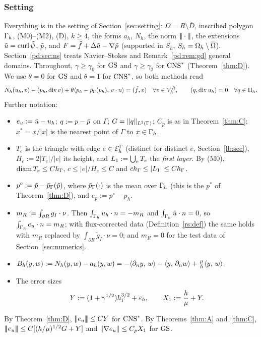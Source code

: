 \subsubsection{Setting}
Everything is in the setting of Section~\ref{sec:setting}: $\Omega=R\setminus\overline D$, inscribed polygon $\Gamma_h$, (M0)--(M2), (D), $k\ge4$, the forms $a_h$, $N_h$, the norm $|\!|\!|\cdot|\!|\!|$, the extensions $\tilde u=\operatorname{curl}\tilde\psi$, $\tilde p$, and $F=\tilde f+\Delta\tilde u-\nabla\tilde p$ (supported in $\overline{S_h}$, $S_h=\Omega_h\setminus\overline\Omega$). Section~\ref{pd:sec:ns} treats Navier--Stokes and Remark~\ref{pd:rem:gd} general domains. Throughout, $\gamma\ge\gamma_0$ for $\mathrm{GS}$ and $\gamma\ge\gamma_2$ for $\mathrm{CNS}^\ast$ (Theorem~\ref{thm:D}). We use $\theta=0$ for $\mathrm{GS}$ and $\theta=1$ for $\mathrm{CNS}^\ast$, so both methods read
\[
N_h(u_h,v)-(p_h,\operatorname{div} v)+\theta\langle p_h-\bar p_{\Gamma}(p_h),\, v\cdot n\rangle=(\tilde f,v)\quad\forall v\in V_h^R,\qquad (q,\operatorname{div} u_h)=0\quad\forall q\in\Pi_h .
\]
Further notation:
\begin{itemize}
\item $e_u:=\tilde u-u_h$; $q:=p-\bar p$ on $\Gamma$; $G=\lVert q\rVert_{L^2(\Gamma)}$; $C_p$ is as in Theorem~\ref{thm:C}; $x^\ast=x/|x|$ is the nearest point of $\Gamma$ to $x\in\Gamma_h$.
\item $T_e$ is the triangle with edge $e\in\mathcal E_h^\Gamma$ (distinct for distinct $e$, Section~\ref{lb:sec}), $H_e:=2|T_e|/|e|$ its height, and $L_1:=\bigcup_eT_e$ the \emph{first layer}. By (M0), $\operatorname{diam} T_e\le Ch_\Gamma$, $c\le |e|/H_e\le C$ and $ch_\Gamma\le|L_1|\le Ch_\Gamma$.
\item $p^\circ:=\tilde p-\bar p_{\Gamma}(\tilde p)$, where $\bar p_{\Gamma}(\cdot)$ is the mean over $\Gamma_h$ (this is the $p^\ast$ of Theorem~\ref{thm:D}), and $e_p:=p^\circ-p_h$.
\item $m_R:=\int_{\partial R}g_I\cdot\nu$. Then $\int_{\Gamma_h}u_h\cdot n=-m_R$ and $\int_{\Gamma_h}\tilde u\cdot n=0$, so $\int_{\Gamma_h}e_u\cdot n=m_R$; with flux-corrected data (Definition~\ref{rs:def}) the same holds with $m_R$ replaced by $\int_{\partial R}\tilde g_I\cdot\nu=0$; and $m_R=0$ for the test data of Section~\ref{sec:numerics}.
\item $B_h(y,w):=N_h(y,w)-a_h(y,w)=-\langle \partial_n y,\, w\rangle-\langle y,\, \partial_n w\rangle+\frac\mu h\langle y,\, w\rangle$.
\item The error sizes
\[
Y:=(1+\gamma^{1/2})h_\Gamma^{3/2}+\varepsilon_h,\qquad X_1:=\frac h\mu+Y .
\]
\end{itemize}
By Theorem~\ref{thm:D}, $|\!|\!|e_u|\!|\!|\le CY$ for $\mathrm{CNS}^\ast$. By Theorems~\ref{thm:A} and~\ref{thm:C}, $|\!|\!|e_u|\!|\!|\le C[(h/\mu)^{1/2}G+Y]$ and $\lVert \nabla e_u\rVert\le C_pX_1$ for $\mathrm{GS}$.

